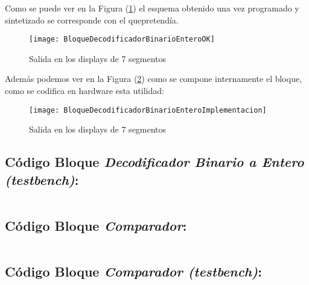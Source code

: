     Como se puede ver en la Figura (\ref{fig:BloqueDecodificadorBinarioEnteroOK}) el esquema obtenido una vez programado y sintetizado se corresponde con el quepretendía.
    \begin{figure}[H]
		    \centering
		    \texttt{[image: BloqueDecodificadorBinarioEnteroOK]}
		    \caption{Salida en los displays de 7 segmentos}
		    \label{fig:BloqueDecodificadorBinarioEnteroOK}
	\end{figure}
    Además podemos ver en la Figura (\ref{fig:BloqueDecodificadorBinarioEnteroImplementacion}) como se compone internamente el bloque, como se codifica en hardware esta utilidad:
    \begin{figure}[H]
		    \centering
		    \texttt{[image: BloqueDecodificadorBinarioEnteroImplementacion]}
		    \caption{Salida en los displays de 7 segmentos}
		    \label{fig:BloqueDecodificadorBinarioEnteroImplementacion}
	\end{figure}
    
\subsection{Código Bloque \textit{Decodificador Binario a Entero (testbench)}:} \label{code:DecodificadorBinarioEntero_tb}
    \inputminted[frame=lines,fontsize=\footnotesize,linenos]{vhdl}{CodeFiles/DecodificadorBinarioEntero_tb.vhd}
    
\subsection{Código Bloque \textit{Comparador}:} \label{code:Comparador}
    \inputminted[frame=lines,fontsize=\footnotesize,linenos]{vhdl}{CodeFiles/Comparador.vhd}	

\subsection{Código Bloque \textit{Comparador (testbench)}:} \label{code:Comparador_tb}
